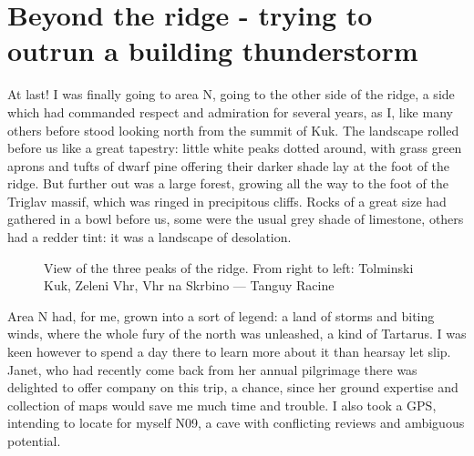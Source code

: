 \section{Beyond the ridge - trying to outrun a building thunderstorm}
\begin{marginfigure}
\end{marginfigure}
At last! I was finally going to area N, going to the other side of the ridge, a side which had commanded respect and admiration for several years, as I, like many others before stood looking north from the summit of Kuk. The landscape rolled before us like a great  tapestry: little white peaks dotted around, with grass green aprons and tufts of dwarf pine offering their darker shade lay at the foot of the ridge. But further out was a large forest, growing all the way to the foot of the Triglav massif, which was ringed in precipitous cliffs. Rocks of a great size had gathered in a bowl before us, some were the usual grey shade of limestone, others had a redder tint: it was a landscape of desolation.

\begin{figure*}[b!]
    \checkoddpage \ifoddpage \forcerectofloat \else \forceversofloat \fi
    \centering
    \label{AreaNrob}
    \caption{View of the three peaks of the ridge. From right to left: Tolminski Kuk, Zeleni Vhr, Vhr na Skrbino --- Tanguy Racine}
\end{figure*}

Area N had, for me, grown into a sort of legend: a land of storms and biting winds, where the whole fury of the north was unleashed, a kind of Tartarus. I was keen however to spend a day there to learn more about it than hearsay let slip. Janet, who had recently come back from her annual pilgrimage there was delighted to offer company on this trip, a chance, since her ground expertise and collection of maps would save me much time and trouble. I also took a GPS, intending to locate for myself N09, a cave with conflicting reviews and ambiguous potential. 

